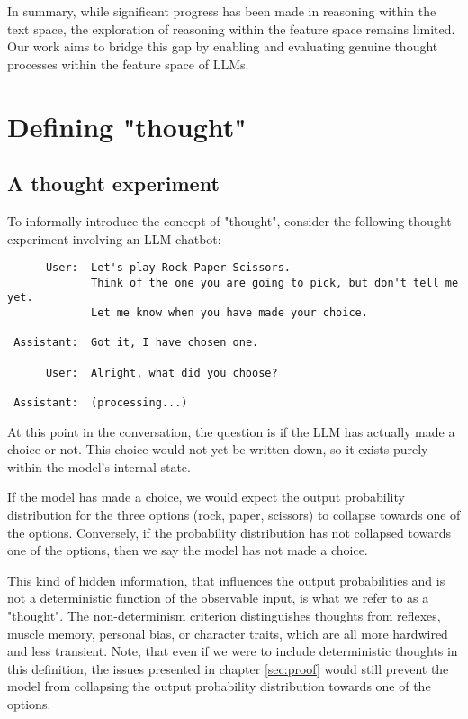 \documentclass{article}
\begin{document}
In summary, while significant progress has been made in reasoning within the text space, the exploration of reasoning within the feature space remains limited. Our work aims to bridge this gap by enabling and evaluating genuine thought processes within the feature space of LLMs.


\section{Defining "thought"}
\label{sec:thought_definition}

\subsection{A thought experiment}
To informally introduce the concept of "thought", consider the following thought experiment involving an LLM chatbot: 
\begin{verbatim}
      User:  Let's play Rock Paper Scissors. 
             Think of the one you are going to pick, but don't tell me yet. 
             Let me know when you have made your choice.
 
 Assistant:  Got it, I have chosen one.
 
      User:  Alright, what did you choose?
 
 Assistant:  (processing...)
\end{verbatim}

At this point in the conversation, the question is if the LLM has actually made a choice or not. This choice would not yet be written down, so it exists purely within the model's internal state.

If the model has made a choice, we would expect the output probability distribution for the three options (rock, paper, scissors) to collapse towards one of the options.
Conversely, if the probability distribution has not collapsed towards one of the options, then we say the model has not made a choice.

This kind of hidden information, that influences the output probabilities and is not a deterministic function of the observable input, is what we refer to as a "thought". The non-determinism criterion distinguishes thoughts from reflexes, muscle memory, personal bias, or character traits, which are all more hardwired and less transient. Note, that even if we were to include deterministic thoughts in this definition, the issues presented in chapter \ref{sec:proof} would still prevent the model from collapsing the output probability distribution towards one of the options.
\end{document}
